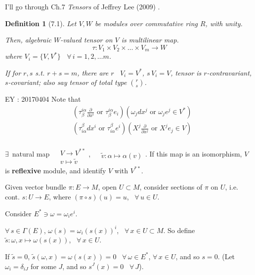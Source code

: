 \documentclass[10pt]{amsart}
\newtheorem{definition}{Definition}
\newcommand{\exercisehead}[1]
  { \smallskip
   \noindent{\small\bf Exercise #1.}
  }
\begin{document}
\begin{multicols*}{2}
I'll go through Ch.7 \emph{Tensors} of Jeffrey Lee (2009) \cite{JLee2009}.  

\begin{definition}[7.1\cite{JLee2009}] Let $V,W$ be modules over commutative ring $R$, with unity.  

Then, algebraic $W$-valued tensor on $V$ is multilinear map.  
\begin{equation}
	\tau: V_1 \times V_2 \times \dots \times V_m \to W
\end{equation}
where $V_i = \lbrace V,V^* \rbrace$ \quad \, $ \forall \, i=1,2,\dots m$.  

If for $r,s$ s.t. $r+s =m$, there are $r$ \, $V_i = V^*$, $s \, V_i = V$, tensor is $r$-contravariant, $s$-covariant; also say tensor of total type $\binom{r}{s}$.  
\end{definition}

EY : 20170404 Note that 
\[
\begin{aligned}
	& ( \tau_{\beta}^{i\alpha} \frac{ \partial }{ \partial x^i } \text{ or } \tau_{\beta}^{i\alpha} e_i )(\omega_j dx^j \text{ or } \omega_je^j  \in V^*) \\ 
	& ( \tau^{\beta}_{i\alpha} dx^i \text{ or } \tau^{\beta}_{i\alpha} e^i )( X^j \frac{ \partial }{ \partial x^j} \text{ or } X^j e_j  \in V) 
\end{aligned}
\]

$\exists \,$ natural map $\begin{aligned} & \quad \\ 
	& V\to V^{**} \\ 
& v \mapsto \widetilde{v} \end{aligned}$,  $\begin{aligned} & \quad \\ 
	& \widetilde{v} : \alpha \mapsto \alpha(v) \end{aligned}$.  If this map is an isomorphism, $V$ is \textbf{reflexive} module, and identify $V$ with $V^{**}$.  

\exercisehead{7.5} Given vector bundle $\pi: E \to M$, open $U\subset M$, consider sections of $\pi$ on $U$, i.e. cont. $s:U\to E$, where $(\pi\circ s)(u)=u$, \, $\forall \, u \in U$.  

Consider $E^* \ni \omega =\omega_i e^i$.  

$\forall \, s\in \Gamma(E)$, $\omega(s) = \omega_i(s(x))^i$, \, $\forall \, x \in U\subset M$.  So define $\widetilde{s}: \omega,x\mapsto \omega(s(x))$, \, $\forall \, x \in U$.  

If $\widetilde{s} =0$, $\widetilde{s}(\omega,x) = \omega(s(x)) =0$ \quad \, $\forall \, \omega \in E^*$, $\forall \, x\in U$, and so $s=0$.  (Let $\omega_i = \delta_{iJ}$ for some $J$, and so $s^J(x) =0$ \quad \, $\forall \, J$).  


\end{multicols*}
\end{document}
